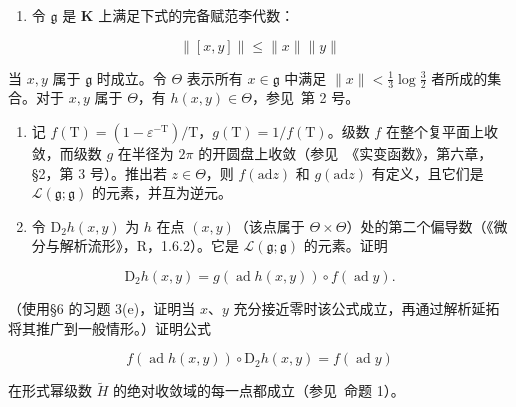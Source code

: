 
\begin{enumerate}
\def\labelenumi{\arabic{enumi}.}
\tightlist
\item
  令 \(\mathfrak{g}\) 是 \(\mathbf{K}\) 上满足下式的完备赋范李代数：
\end{enumerate}

\[
\| [ x, y ] \| \leqslant \| x \| \| y \|
\]

当 \(x, y\) 属于 \(\mathfrak{g}\) 时成立。令 \(\Theta\) 表示所有 \(x \in \mathfrak{g}\) 中满足 \(\| x \| < \frac{1}{3} \log \frac{3}{2}\) 者所成的集合。对于 \(x, y\) 属于 \(\Theta\)，有 \(h(x, y) \in \Theta\)，参见~第 2 号。

\begin{enumerate}
\def\labelenumi{(\alph{enumi})}
\item
  记 \(f(\mathrm{T}) = (1 - \varepsilon^{-\mathrm{T}}) / \mathrm{T}\)，\(g(\mathrm{T}) = 1 / f(\mathrm{T})\)。级数 \(f\) 在整个复平面上收敛，而级数 \(g\) 在半径为 \(2\pi\) 的开圆盘上收敛（参见~《实变函数》，第六章，§2，第 3 号）。推出若 \(z \in \Theta\)，则 \(f(\mathrm{ad}z)\) 和 \(g(\mathrm{ad}z)\) 有定义，且它们是 \(\mathcal{L}(\mathfrak{g};\mathfrak{g})\) 的元素，并互为逆元。
\item
  令 \(\mathrm{D}_2h(x,y)\) 为 \(h\) 在点 \((x,y)\)（该点属于 \(\Theta \times \Theta\)）处的第二个偏导数（《微分与解析流形》，R，1.6.2）。它是 \(\mathcal{L}(\mathfrak{g};\mathfrak{g})\) 的元素。证明
\end{enumerate}

\[
\mathrm{D} _ {2} h (x, y) = g (\operatorname{ad} h (x, y)) \circ f (\operatorname{ad} y).
\]

（使用§6 的习题 3(e)，证明当 \(x\)、\(y\) 充分接近零时该公式成立，再通过解析延拓将其推广到一般情形。）证明公式

\[
f (\operatorname{ad} h (x, y)) \circ \mathrm{D} _ {2} h (x, y) = f (\operatorname{ad} y)
\]

在形式幂级数 \(\tilde{H}\) 的绝对收敛域的每一点都成立（参见~命题 1）。

